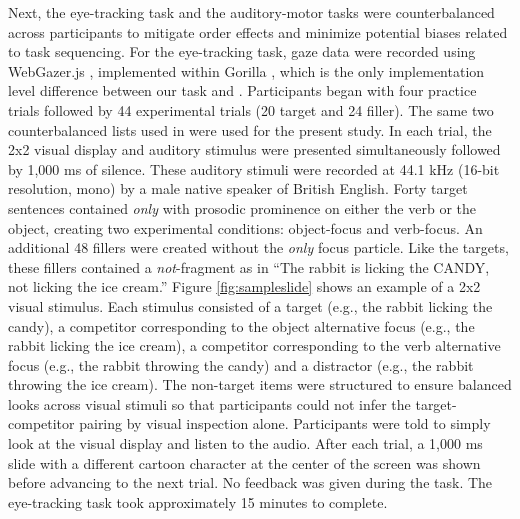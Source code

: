 Next, the eye-tracking task and the auditory-motor tasks were counterbalanced across participants to mitigate order effects and minimize potential biases related to task sequencing. For the eye-tracking task, gaze data were recorded using WebGazer.js \parencite{Papoutsaki}, implemented within Gorilla \parencite{Anwyl-Irvine_2019}, which is the only implementation level difference between our task and \textcite{ge2021a}. Participants began with four practice trials followed by 44 experimental trials (20 target and 24 filler). The same two counterbalanced lists used in \textcite{ge2021a} were used for the present study. In each trial, the 2x2 visual display and auditory stimulus were presented simultaneously followed by 1,000 ms of silence. These auditory stimuli were recorded at 44.1 kHz (16-bit resolution, mono) by a male native speaker of British English. Forty target sentences contained \textit{only} with prosodic prominence on either the verb or the object, creating two experimental conditions: object-focus and verb-focus. An additional 48 fillers were created without the \textit{only} focus particle. Like the targets, these fillers contained a \textit{not}-fragment as in “The rabbit is licking the CANDY, not licking the ice cream.” Figure \ref{fig:sampleslide} shows an example of a 2x2 visual stimulus. Each stimulus consisted of a target (e.g., the rabbit licking the candy), a competitor corresponding to the object alternative focus (e.g., the rabbit licking the ice cream), a competitor corresponding to the verb alternative focus (e.g., the rabbit throwing the candy) and a distractor (e.g., the rabbit throwing the ice cream). The non-target items were structured to ensure balanced looks across visual stimuli so that participants could not infer the target-competitor pairing by visual inspection alone. Participants were told to simply look at the visual display and listen to the audio. After each trial, a 1,000 ms slide with a different cartoon character at the center of the screen was shown before advancing to the next trial. No feedback was given during the task. The eye-tracking task took approximately 15 minutes to complete.

